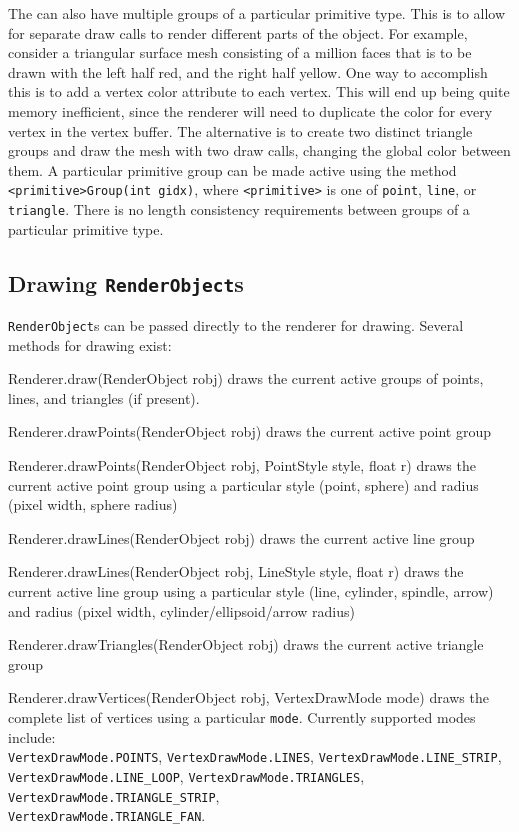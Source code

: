 \documentclass{article}
\let\olditem\item
\newcommand{\lstitem}[2][]{\olditem[\texttt{#1}]\mbox{}\newline#2}
\newenvironment{lstdescription}{%
   \begin{description}[nolistsep]
   \let\item\lstitem
}{\end{description}}
\begin{document}
The  can also have multiple groups of a particular primitive type.  This
is to allow for separate draw calls to render different parts of the object.  For example, consider
a triangular surface mesh consisting of a million faces that is to be drawn with the left half red, 
and the right half yellow.  One way to accomplish this is to add a vertex color attribute to each vertex.  
This will end up being quite memory inefficient, since the renderer will need to duplicate the color
for every vertex in the vertex buffer.  The alternative is to create two distinct triangle groups
and draw the mesh with two draw calls, changing the global color between them.  A particular primitive
group can be made active using the method \lstinline{<primitive>Group(int gidx)}, 
where \lstinline{<primitive>} is one of \lstinline{point}, \lstinline{line}, or \lstinline{triangle}.
There is no length consistency requirements between groups of a particular primitive type.

\subsection{Drawing \texttt{RenderObject}s}

\lstinline{RenderObject}s can be passed directly to the renderer for drawing.  Several methods for
drawing exist:
\begin{lstdescription}
   \item[Renderer.draw(RenderObject robj)] draws the current active groups of points, lines, and
   triangles (if present).
   \item[Renderer.drawPoints(RenderObject robj)] draws the current active point group
   \item[Renderer.drawPoints(RenderObject robj, PointStyle style, float r)] draws the current 
   active point group using a particular style (point, sphere) and radius (pixel width, sphere radius)
   \item[Renderer.drawLines(RenderObject robj)] draws the current active line group
   \item[Renderer.drawLines(RenderObject robj, LineStyle style, float r)] draws the current 
   active line group using a particular style (line, cylinder, spindle, arrow) and radius
   (pixel width, cylinder/ellipsoid/arrow radius)
   \item[Renderer.drawTriangles(RenderObject robj)] draws the current active triangle group
   \item[Renderer.drawVertices(RenderObject robj, VertexDrawMode mode)] draws the complete
      list of vertices using a particular \lstinline{mode}.  Currently supported modes
      include:\\
      \lstinline{VertexDrawMode.POINTS}, \lstinline{VertexDrawMode.LINES}, \lstinline{VertexDrawMode.LINE_STRIP},\\
      \lstinline{VertexDrawMode.LINE_LOOP}, \lstinline{VertexDrawMode.TRIANGLES}, \lstinline{VertexDrawMode.TRIANGLE_STRIP},\\
      \lstinline{VertexDrawMode.TRIANGLE_FAN}.
\end{lstdescription}
\end{document}
